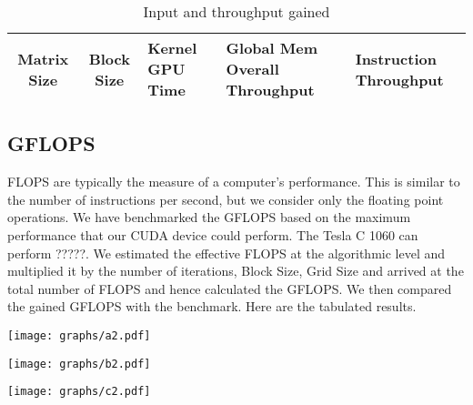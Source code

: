 \documentclass[10pt]{article}
\makeatletter
\newenvironment{figurehere}
    {\def\@captype{figure}}
    {}
\makeatother
\begin{document}
\begin{multicols}{2}
    \begin{table}\footnotesize
    \centering
        \begin{tabular}{ | c | c | p{1.2cm} | p{1.5cm} | p{1.0cm} | }
        \hline
        Matrix Size & Block Size & Kernel GPU Time & Global Mem Overall Throughput & Instruction Throughput \\
        \hline
        \end{tabular}
        \caption{Input and throughput gained}
        \label{tab:input_throughput}
    \end{table}

    \subsection{GFLOPS}
    FLOPS are typically the measure of a computer’s performance.
    This is similar to the number of instructions per second, but we consider only the floating point operations.
    We have benchmarked the GFLOPS based on the maximum performance that our CUDA device could perform.
    The Tesla C 1060 can perform ?????.
    We estimated the effective FLOPS at the algorithmic level and multiplied it by the number of iterations, Block Size, Grid Size and arrived at the total number of FLOPS and hence calculated the GFLOPS.
    We then compared the gained GFLOPS with the benchmark.
    Here are the tabulated results.

    \begin{center}
    \begin{figurehere}
        \texttt{[image: graphs/a2.pdf]}
        \caption{}
        \label{fig:gflops1}
    \end{figurehere}
    \end{center}

    \begin{center}
    \begin{figurehere}
        \texttt{[image: graphs/b2.pdf]}
        \caption{}
        \label{fig:gflops2}
    \end{figurehere}
    \end{center}

    \begin{center}
    \begin{figurehere}
        \texttt{[image: graphs/c2.pdf]}
        \caption{}
        \label{fig:gflops3}
    \end{figurehere}
    \end{center}


\end{multicols}
\end{document}
